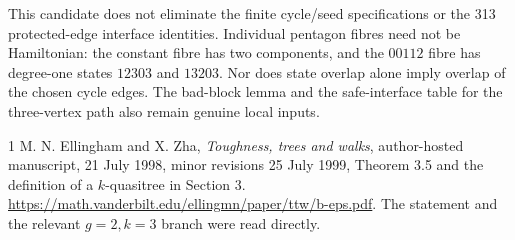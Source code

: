 \documentclass[11pt]{article}
\theoremstyle{remark}\newtheorem{remark}[lemma]{Remark}
\begin{document}
This candidate does not eliminate the finite cycle/seed specifications
or the 313 protected-edge interface identities. Individual pentagon
fibres need not be Hamiltonian: the constant fibre has two components,
and the $00112$ fibre has degree-one states $12303$ and $13203$.
Nor does state overlap alone imply overlap of the chosen cycle edges.
The bad-block lemma and the safe-interface table for the three-vertex
path also remain genuine local inputs.

\begin{thebibliography}{1}
 M. N. Ellingham and X. Zha,
\emph{Toughness, trees and walks}, author-hosted manuscript,
21 July 1998, minor revisions 25 July 1999, Theorem 3.5 and the
definition of a $k$-quasitree in Section 3.
\url{https://math.vanderbilt.edu/ellingmn/paper/ttw/b-eps.pdf}.
The statement and the relevant $g=2,k=3$ branch were read directly.
\end{thebibliography}
\end{document}
